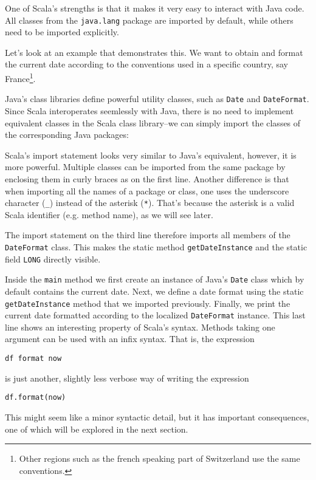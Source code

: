 \documentclass[a4paper,12pt,twoside,titlepage]{article}
\begin{document}
One of Scala's strengths is that it makes it very easy to interact
with Java code. All classes from the \lstinline?java.lang? package are
imported by default, while others need to be imported explicitly.

Let's look at an example that demonstrates this.  We want to obtain
and format the current date according to the conventions used in a
specific country, say France\footnote{Other regions such as the french
  speaking part of Switzerland use the same conventions.}.

Java's class libraries define powerful utility classes, such as
\lstinline?Date? and \lstinline?DateFormat?. Since Scala interoperates
seemlessly with Java, there is no need to implement equivalent
classes in the Scala class library--we can simply import the classes
of the corresponding Java packages:

Scala's import statement looks very similar to Java's equivalent,
however, it is more powerful. Multiple classes can be imported from
the same package by enclosing them in curly braces as on the first
line. Another difference is that when importing all the names of a
package or class, one uses the underscore character (\lstinline?_?) instead
of the asterisk (\lstinline?*?). That's because the asterisk is a valid
Scala identifier (e.g. method name), as we will see later.

The import statement on the third line therefore imports all members
of the \lstinline?DateFormat? class. This makes the static method
\lstinline?getDateInstance? and the static field \lstinline?LONG? directly
visible.

Inside the \lstinline?main? method we first create an instance of Java's
\lstinline?Date? class which by default contains the current date. Next, we
define a date format using the static \lstinline?getDateInstance? method
that we imported previously. Finally, we print the current date
formatted according to the localized \lstinline?DateFormat? instance. This
last line shows an interesting property of Scala's syntax. Methods
taking one argument can be used with an infix syntax. That is, the
expression
\begin{lstlisting}
df format now
\end{lstlisting}
is just another, slightly less verbose way of writing the expression
\begin{lstlisting}
df.format(now)
\end{lstlisting}
This might seem like a minor syntactic detail, but it has important
consequences, one of which will be explored in the next section.
\end{document}
